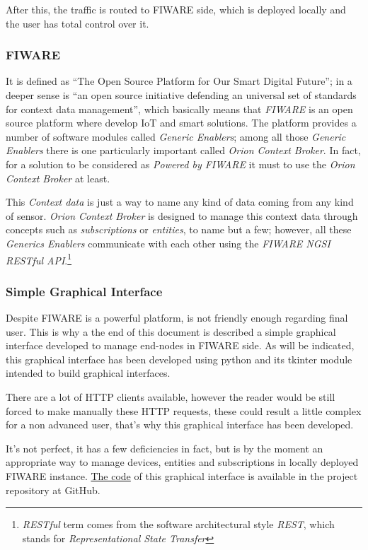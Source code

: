 \documentclass[11pt,a4paper,dvipsnames,twoside]{article}
\begin{document}
After this, the traffic is routed to FIWARE side, which is deployed locally and the user has total control over it.

\subsubsection{FIWARE}
It is defined as \enquote{The Open Source Platform for Our Smart Digital Future}\cite{FIWARE}; in a deeper sense is \enquote{an open source initiative defending an universal set of standards for context data management}\cite{FIWARE}, which basically means that \textit{FIWARE} is an open source platform where develop IoT and smart solutions. The platform provides a number of software modules called \textit{Generic Enablers}; among all those \textit{Generic Enablers} there is one particularly important called \textit{Orion Context Broker}. In fact, for a solution to be considered as \textit{Powered by FIWARE} it must to use the \textit{Orion Context Broker} at least. 

This \textit{Context data} is just a way to name any kind of data coming from any kind of sensor. \textit{Orion Context Broker} is designed to manage this context data through concepts such as \textit{subscriptions} or \textit{entities}, to name but a few; however, all these \textit{Generics Enablers} communicate with each other using the \textit{FIWARE NGSI RESTful API}\cite{NGSI}.\footnote{\textit{RESTful} term comes from the software architectural style \textit{REST}, which stands for \textit{Representational State Transfer}}

\subsubsection{Simple Graphical Interface}
Despite FIWARE is a powerful platform, is not friendly enough regarding final user. This is why a the end of this document is described a simple graphical interface developed to manage end-nodes in FIWARE side. As will be indicated, this graphical interface has been developed using python and its tkinter module intended to build graphical interfaces.

There are a lot of HTTP clients available, however the reader would be still forced to make manually these HTTP requests, these could result a little complex for a non advanced user, that's why this graphical interface has been developed.

It's not perfect, it has a few deficiencies in fact, but is by the moment an appropriate way to manage devices, entities and subscriptions in locally deployed FIWARE instance. \href{https://github.com/WyRe/lora-arduino-dendrometer/blob/master/src/api-gui/api-gui.py}{The code} of this graphical interface is available in the project repository at GitHub.
\end{document}
